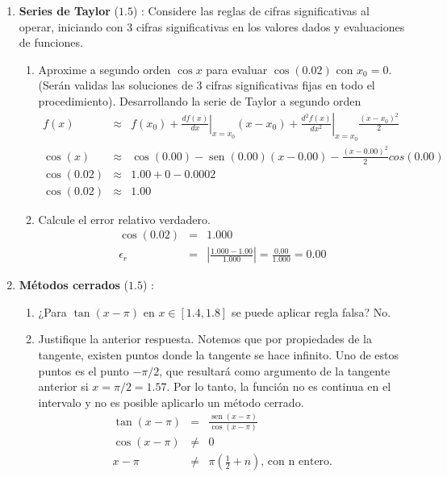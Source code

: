 \documentclass[12pt]{article}
\renewcommand{\sin}{\operatorname{sen}}
\DeclareMathOperator{\sen}{sen}
\renewcommand{\sin}{\sen}
\begin{document}
  \begin{enumerate}[leftmargin=*,widest=9]
    \item \textbf{Series de Taylor} ($1.5$) : Considere las reglas de cifras significativas al operar, iniciando con 3 cifras significativas en los valores dados y evaluaciones de funciones.
    \begin{enumerate}[label=\alph*]
    \item Aproxime a segundo orden $\cos x$ para evaluar $\cos (0.02)$ con $x_0 = 0$. 
    (Serán validas las soluciones de 3 cifras significativas fijas en todo el procedimiento).
    Desarrollando la serie de Taylor a segundo orden
    \begin{eqnarray*}
    f(x) & \approx & f(x_0) + \left.\frac{df(x)}{dx}\right|_{x=x_0}(x-x_0)+ \left.\frac{d^2f(x)}{dx^2}\right|_{x=x_0}\frac{(x-x_0)^2}{2}\\
    \cos(x) & \approx & \cos(0.00) - \sin(0.00)(x-0.00) - \frac{(x - 0.00)^2}{2}cos(0.00) \\
    \cos(0.02) & \approx & 1.00 + 0 - 0.0002\\
    \cos(0.02) & \approx & 1.00
    \end{eqnarray*}
    \item Calcule el error relativo verdadero.
    \begin{eqnarray*}
    \cos(0.02) & = & 1.000\\
    \epsilon_r & = & \left| \frac{1.000 - 1.00}{1.000} \right| = \frac{0.00}{1.000} = 0.00  
    \end{eqnarray*}
    \end{enumerate}
    \item \textbf{Métodos cerrados} ($1.5$) :
    \begin{enumerate}[label=\alph*]
    \item ¿Para $\tan (x - \pi)$ en $x \in \left[ 1.4, 1.8 \right]$ se puede aplicar regla falsa?
    No.
    \item Justifique la anterior respuesta.
    Notemos que por propiedades de la tangente, existen puntos donde la tangente se hace infinito. Uno de estos puntos es el punto \(-\pi / 2\), que resultará como argumento de la tangente anterior si \(x = \pi / 2 = 1.57 \). Por lo tanto, la función no es continua en el intervalo y no es posible aplicarlo un método cerrado.
   \begin{eqnarray*}
   \tan(x- \pi) & = & \frac{\sin(x-\pi)}{\cos(x-\pi)} \\
   \cos(x - \pi) & \neq & 0 \\
   x - \pi & \neq & \pi \left( \frac{1}{2} + n \right) \text{, con n entero.} \\

\end{eqnarray*}
\end{enumerate}
\end{enumerate}
\end{document}
